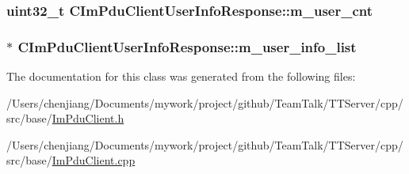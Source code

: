 \subsubsection[{m\+\_\+user\+\_\+cnt}]{\setlength{\rightskip}{0pt plus 5cm}uint32\+\_\+t C\+Im\+Pdu\+Client\+User\+Info\+Response\+::m\+\_\+user\+\_\+cnt\hspace{0.3cm}{\ttfamily [private]}}\label{class_c_im_pdu_client_user_info_response_a55b95f4b5bd4903cdabc72bcd61ce786}
\hypertarget{class_c_im_pdu_client_user_info_response_adad3b3e47e2acad8ea32e679d338ccf2}{}
\subsubsection[{m\+\_\+user\+\_\+info\+\_\+list}]{$\ast$ C\+Im\+Pdu\+Client\+User\+Info\+Response\+::m\+\_\+user\+\_\+info\+\_\+list\hspace{0.3cm}{\ttfamily [private]}}\label{class_c_im_pdu_client_user_info_response_adad3b3e47e2acad8ea32e679d338ccf2}


The documentation for this class was generated from the following files\+:\begin{DoxyCompactItemize}
\item 
/\+Users/chenjiang/\+Documents/mywork/project/github/\+Team\+Talk/\+T\+T\+Server/cpp/src/base/\hyperlink{_im_pdu_client_8h}{Im\+Pdu\+Client.\+h}\item 
/\+Users/chenjiang/\+Documents/mywork/project/github/\+Team\+Talk/\+T\+T\+Server/cpp/src/base/\hyperlink{_im_pdu_client_8cpp}{Im\+Pdu\+Client.\+cpp}\end{DoxyCompactItemize}
